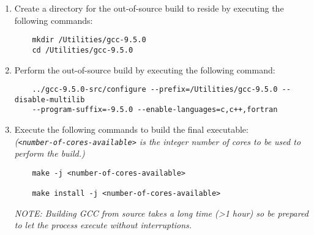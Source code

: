 \begin{enumerate}
	\item Create a directory for the out-of-source build to reside by executing the following commands:
	\begin{verbatim}
	mkdir /Utilities/gcc-9.5.0
	cd /Utilities/gcc-9.5.0
	\end{verbatim}
	
	\item Perform the out-of-source build by executing the following command: \\
	\begin{verbatim}
	../gcc-9.5.0-src/configure --prefix=/Utilities/gcc-9.5.0 --disable-multilib
	--program-suffix=-9.5.0 --enable-languages=c,c++,fortran
	\end{verbatim}
	
	\item Execute the following commands to build the final executable: \\
	\textit{(\texttt{<number-of-cores-available>} is the integer number of cores to be used to perform the build.)}
	\begin{verbatim}
	make -j <number-of-cores-available>

	make install -j <number-of-cores-available>
	\end{verbatim}
	
	\textit{NOTE: Building GCC from source takes a long time (\textgreater 1 hour) so be prepared to let the process execute without interruptions.}
\end{enumerate}